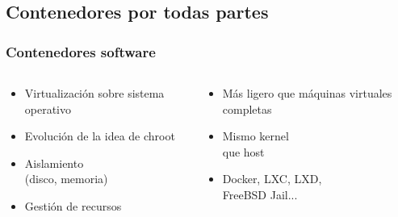 %
%

{\bf
  \textcolor[rgb]{1,1,1}{
    \section{Contenedores por todas partes}
  }
}

\usebackgroundtemplate{}

\begin{frame}
\frametitle{Contenedores software}

\begin{columns}[T]
\begin{column}{.48\textwidth}
{\Large
  \begin{itemize}
  \item Virtualización sobre sistema operativo
  \item Evolución de la idea de chroot
  \item Aislamiento \\
    (disco, memoria) \\
  \item Gestión de recursos
  \end{itemize}
}
\end{column}%
\hfill%
\begin{column}{.40\textwidth}
{\Large
  \begin{itemize}
  \item Más ligero que máquinas virtuales completas
  \item Mismo kernel \\
    que host \\
  \item Docker, LXC, LXD, \\
    FreeBSD Jail... \\
\end{itemize}
}
\end{column}%
\end{columns}

\end{frame}


